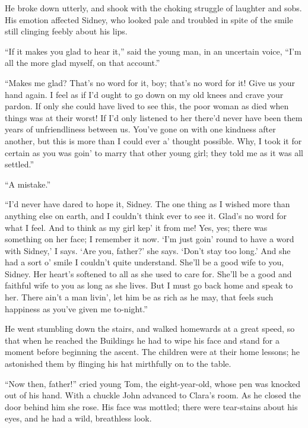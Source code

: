 He broke down utterly, and shook with the choking struggle of laughter
and sobs. His emotion affected Sidney, who looked pale and troubled in
spite of the smile still clinging feebly about his lips.

``If it makes you glad to hear it,'' said the young man, in an uncertain
voice, ``I'm all the more glad myself, on that account.''

``Makes me glad? That's no word for it, boy; that's no word for it! Give
us your hand again. I feel as if I'd ought to go down on my old knees
and crave your pardon. If {\protect\hypertarget{116}{}{}}only she could
have lived to see this, the poor woman as died when things was at their
worst! If I'd only listened to her there'd never have been them years of
unfriendliness between us. You've gone on with one kindness after
another, but this is more than I could ever a' thought possible. Why, I
took it for certain as you was goin' to marry that other young girl;
they told me as it was all settled.''

``A mistake.''

``I'd never have dared to hope it, Sidney. The one thing as I wished
more than anything else on earth, and I couldn't think ever to see it.
Glad's no word for what I feel. And to think as my girl kep' it from me!
Yes, yes; there was something on her face; I remember it now. `I'm just
goin' round to have a word with Sidney,' I says. `Are you, father?' she
says. `Don't stay too long.' And she had a sort o' smile I couldn't
quite understand. She'll be a good wife to you, Sidney. Her heart's
softened to all as she used to care for. She'll be a good and faithful
wife to you as long as she lives. But I must go back home and speak to
her. There ain't a man {\protect\hypertarget{117}{}{}}livin', let him be
as rich as he may, that feels such happiness as you've given me
to-night.''

He went stumbling down the stairs, and walked homewards at a great
speed, so that when he reached the Buildings he had to wipe his face and
stand for a moment before beginning the ascent. The children were at
their home lessons; he astonished them by flinging his hat mirthfully on
to the table.

``Now then, father!'' cried young Tom, the eight-year-old, whose pen was
knocked out of his hand. With a chuckle John advanced to Clara's room.
As he closed the door behind him she rose. His face was mottled; there
were tear-stains about his eyes, and he had a wild, breathless look.

